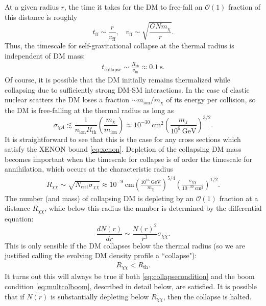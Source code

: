 \documentclass[preprintnumbers,amsmath,amssymb,prd,superscriptaddress]{revtex4}
\newcommand{\OO}{\mathcal{O}}
\newcommand{\GeV}{\text{GeV}}
\newcommand{\cm}{\text{cm}}
\def\r{\right)}
\def\l{\left(}
\begin{document}
At a given radius $r$, the time it takes for the DM to free-fall an $\OO(1)$ fraction of this distance is roughly
\begin{equation}
\label{eq:freefalltime}
t_\text{ff} \sim \frac{r}{v_\text{ff}}, ~~~~ v_\text{ff} \sim \sqrt{\frac{G N m_\chi}{r}}.
\end{equation}
Thus, the timescale for self-gravitational collapse at the thermal radius is independent of DM mass:
\begin{align}
\label{eq:collapsetime}
  t_\text{collapse} \sim \frac{R_\text{th}}{v_\text{th}} \approx 0.1 ~\text{s}.
\end{align}
Of course, it is possible that the DM initially remains thermalized while collapsing due to sufficiently strong DM-SM interactions. 
In the case of elastic nuclear scatters the DM loses a fraction $\sim m_\text{ion}/m_\chi$ of its energy per collision, so the DM is free-falling at the thermal radius as long as
\begin{equation}
\sigma_{\chi A} \lesssim \frac{1}{n_\text{ion} R_\text{th}} \l \frac{m_\chi}{m_\text{ion}}\r \approx 10^{-30} ~\cm^2 \l \frac{m_\chi}{10^6 ~\GeV} \r^{3/2}.
\end{equation}
It is straightforward to see that this is the case for any cross sections which satisfy the XENON bound \eqref{eq:xenon}.
Depletion of the collapsing DM mass becomes important when the timescale for collapse is of order the timescale for annihilation, which occurs at the characteristic radius
\begin{align}
R_{\chi \chi} \sim \sqrt{N_\text{crit} \sigma_{\chi \chi}} \approx 10^{-9} ~\cm  \l \frac{10^{16} ~\GeV}{m_\chi} \r^{5/4} \l \frac{\sigma_{\chi \chi}}{10^{-30} ~\cm^2} \r^{1/2}. 
\end{align}
The number (and mass) of collapsing DM is depleting by an $\OO(1)$ fraction at a distance $R_{\chi \chi}$, while below this radius the number is determined by the differential equation:
\begin{equation}
\frac{dN(r)}{dr} \sim \frac{N(r)^2}{r^3} \sigma_{\chi \chi}.
\end{equation}
This is only sensible if the DM collapses below the thermal radius (so we are justified calling the evolving DM density profile a ``collapse"):
\begin{align}
\label{eq:xicondition}
R_{\chi \chi} < R_\text{th}.
\end{align}
It turns out this will always be true if both \eqref{eq:collapsecondition} and the boom condition \eqref{eq:multcolboom}, described in detail below, are satisfied. 
It is possible that if $N(r)$ is substantially depleting below $R_{\chi \chi}$, then the collapse is halted. 
\end{document}
